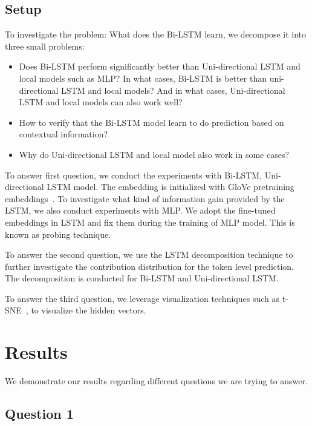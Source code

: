 \documentclass{article}
\begin{document}
\subsection{Setup}

To investigate the problem: What does the Bi-LSTM learn, we decompose it into three small problems:

\begin{itemize}
	\item Does Bi-LSTM perform significantly better than Uni-directional LSTM and local models such as MLP? In what cases, Bi-LSTM is better than uni-directional LSTM and local models? And in what cases, Uni-directional LSTM and local models can also work well?
	\item How to verify that the Bi-LSTM model learn to do prediction based on contextual information?
	\item Why do Uni-directional LSTM and local model also work in some cases? 
\end{itemize}

To answer first question, we conduct the experiments with Bi-LSTM, Uni-directional LSTM model. The embedding is initialized with GloVe pretraining embeddings~\cite{pennington2014glove}. To investigate what kind of information gain provided by the LSTM, we also conduct experiments with MLP. We adopt the fine-tuned embeddings in LSTM and fix them during the training of MLP model. This is known as probing technique. 

To answer the second question, we use the LSTM decomposition technique to further investigate the contribution distribution for the token level prediction. The decomposition is conducted for Bi-LSTM and Uni-directional LSTM. 

To answer the third question, we leverage visualization techniques such as t-SNE~\cite{maaten2008visualizing}, to visualize the hidden vectors.

\section{Results}

We demonstrate our results regarding different questions we are trying to answer. 


\subsection{Question 1}
\end{document}
